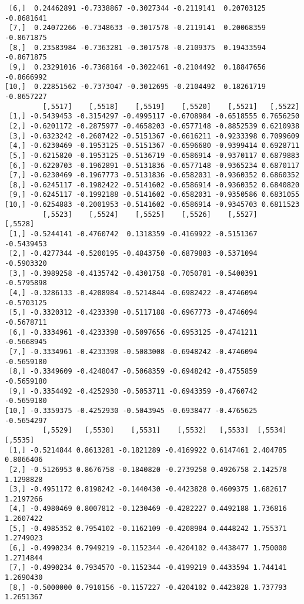 \documentclass[
  letterpaper,
  DIV=11,
  numbers=noendperiod]{scrreprt}
\begin{document}
\begin{verbatim}
 [6,]  0.24462891 -0.7338867 -0.3027344 -0.2119141  0.20703125 -0.8681641
 [7,]  0.24072266 -0.7348633 -0.3017578 -0.2119141  0.20068359 -0.8671875
 [8,]  0.23583984 -0.7363281 -0.3017578 -0.2109375  0.19433594 -0.8671875
 [9,]  0.23291016 -0.7368164 -0.3022461 -0.2104492  0.18847656 -0.8666992
[10,]  0.22851562 -0.7373047 -0.3012695 -0.2104492  0.18261719 -0.8657227
         [,5517]    [,5518]    [,5519]    [,5520]    [,5521]   [,5522]
 [1,] -0.5439453 -0.3154297 -0.4995117 -0.6708984 -0.6518555 0.7656250
 [2,] -0.6201172 -0.2875977 -0.4658203 -0.6577148 -0.8852539 0.6210938
 [3,] -0.6323242 -0.2607422 -0.5151367 -0.6616211 -0.9233398 0.7099609
 [4,] -0.6230469 -0.1953125 -0.5151367 -0.6596680 -0.9399414 0.6928711
 [5,] -0.6215820 -0.1953125 -0.5136719 -0.6586914 -0.9370117 0.6879883
 [6,] -0.6220703 -0.1962891 -0.5131836 -0.6577148 -0.9365234 0.6870117
 [7,] -0.6230469 -0.1967773 -0.5131836 -0.6582031 -0.9360352 0.6860352
 [8,] -0.6245117 -0.1982422 -0.5141602 -0.6586914 -0.9360352 0.6840820
 [9,] -0.6245117 -0.1992188 -0.5141602 -0.6582031 -0.9350586 0.6831055
[10,] -0.6254883 -0.2001953 -0.5141602 -0.6586914 -0.9345703 0.6811523
         [,5523]    [,5524]    [,5525]    [,5526]    [,5527]    [,5528]
 [1,] -0.5244141 -0.4760742  0.1318359 -0.4169922 -0.5151367 -0.5439453
 [2,] -0.4277344 -0.5200195 -0.4843750 -0.6879883 -0.5371094 -0.5903320
 [3,] -0.3989258 -0.4135742 -0.4301758 -0.7050781 -0.5400391 -0.5795898
 [4,] -0.3286133 -0.4208984 -0.5214844 -0.6982422 -0.4746094 -0.5703125
 [5,] -0.3320312 -0.4233398 -0.5117188 -0.6967773 -0.4746094 -0.5678711
 [6,] -0.3334961 -0.4233398 -0.5097656 -0.6953125 -0.4741211 -0.5668945
 [7,] -0.3334961 -0.4233398 -0.5083008 -0.6948242 -0.4746094 -0.5659180
 [8,] -0.3349609 -0.4248047 -0.5068359 -0.6948242 -0.4755859 -0.5659180
 [9,] -0.3354492 -0.4252930 -0.5053711 -0.6943359 -0.4760742 -0.5659180
[10,] -0.3359375 -0.4252930 -0.5043945 -0.6938477 -0.4765625 -0.5654297
         [,5529]   [,5530]    [,5531]    [,5532]   [,5533]  [,5534]   [,5535]
 [1,] -0.5214844 0.8613281 -0.1821289 -0.4169922 0.6147461 2.404785 0.8066406
 [2,] -0.5126953 0.8676758 -0.1840820 -0.2739258 0.4926758 2.142578 1.1298828
 [3,] -0.4951172 0.8198242 -0.1440430 -0.4423828 0.4609375 1.682617 1.2197266
 [4,] -0.4980469 0.8007812 -0.1230469 -0.4282227 0.4492188 1.736816 1.2607422
 [5,] -0.4985352 0.7954102 -0.1162109 -0.4208984 0.4448242 1.755371 1.2749023
 [6,] -0.4990234 0.7949219 -0.1152344 -0.4204102 0.4438477 1.750000 1.2714844
 [7,] -0.4990234 0.7934570 -0.1152344 -0.4199219 0.4433594 1.744141 1.2690430
 [8,] -0.5000000 0.7910156 -0.1157227 -0.4204102 0.4423828 1.737793 1.2651367

\end{verbatim}
\end{document}
